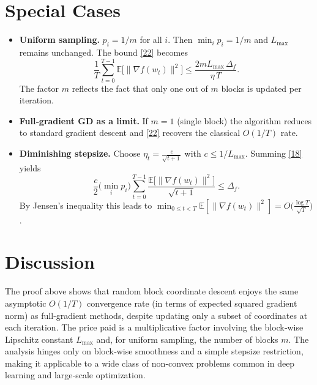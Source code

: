 \documentclass{article}
\begin{document}
\section*{Special Cases}
\begin{itemize}
\item \textbf{Uniform sampling.} $p_i=1/m$ for all $i$.
    Then $\min_i p_i = 1/m$ and $L_{\max}$ remains unchanged.
    The bound \eqref{22} becomes
    \[
    \frac{1}{T}\sum_{t=0}^{T-1}\mathbb{E}\!\bigl[\|\nabla f(w_t)\|^{2}\bigr]
    \le
    \frac{2mL_{\max}\,\Delta_f}{\eta\,T}.
    \]
    The factor $m$ reflects the fact that only one out of $m$ blocks is updated per iteration.

\item \textbf{Full‑gradient GD as a limit.} If $m=1$ (single block) the algorithm reduces to
    standard gradient descent and \eqref{22} recovers the classical $O(1/T)$ rate.

\item \textbf{Diminishing stepsize.} Choose $\eta_t = \frac{c}{\sqrt{t+1}}$ with $c\le 1/L_{\max}$.
    Summing \eqref{18} yields
    \[
    \frac{c}{2}\bigl(\min_i p_i\bigr)\sum_{t=0}^{T-1}\frac{\mathbb{E}\!\bigl[\|\nabla f(w_t)\|^{2}\bigr]}{\sqrt{t+1}}
    \le \Delta_f .
    \]
    By Jensen’s inequality this leads to
    $\min_{0\le t<T}\mathbb{E}[\|\nabla f(w_t)\|^{2}]
    =O\!\bigl(\frac{\log T}{\sqrt{T}}\bigr)$.
\end{itemize}

\section*{Discussion}
The proof above shows that random block coordinate descent enjoys the same
asymptotic $O(1/T)$ convergence rate (in terms of expected squared gradient norm) as full‑gradient methods, despite updating only a subset of coordinates at each iteration.
The price paid is a multiplicative factor involving the block‑wise Lipschitz constant $L_{\max}$ and, for uniform sampling, the number of blocks $m$.
The analysis hinges only on block‑wise smoothness and a simple stepsize restriction,
making it applicable to a wide class of non‑convex problems common in deep learning and large‑scale optimization.
\end{document}
